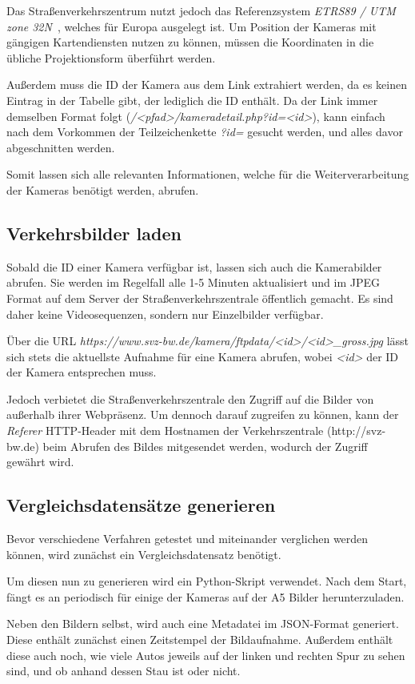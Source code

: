 Das Straßenverkehrszentrum nutzt jedoch das Referenzsystem {\em ETRS89 / UTM zone 32N}~\cite{etrs89}, welches für Europa ausgelegt ist.
Um Position der Kameras mit gängigen Kartendiensten nutzen zu können, müssen die Koordinaten in die übliche Projektionsform überführt werden.

Außerdem muss die ID der Kamera aus dem Link extrahiert werden, da es keinen Eintrag in der Tabelle gibt, der lediglich die ID enthält.
Da der Link immer demselben Format folgt ({\em /<pfad>/kameradetail.php?id=<id>}), kann einfach nach dem Vorkommen der Teilzeichenkette {\em ?id=} gesucht werden, und alles davor abgeschnitten werden.

Somit lassen sich alle relevanten Informationen, welche für die Weiterverarbeitung der Kameras benötigt werden, abrufen.

\subsection{Verkehrsbilder laden}
Sobald die ID einer Kamera verfügbar ist, lassen sich auch die Kamerabilder abrufen.
Sie werden im Regelfall alle 1-5 Minuten aktualisiert und im JPEG Format auf dem Server der Straßenverkehrszentrale öffentlich gemacht.
Es sind daher keine Videosequenzen, sondern nur Einzelbilder verfügbar.

Über die URL {\em https://www.svz-bw.de/kamera/ftpdata/<id>/<id>\_gross.jpg} lässt sich stets die aktuellste Aufnahme für eine Kamera abrufen, wobei {\em <id>} der ID der Kamera entsprechen muss.

Jedoch verbietet die Straßenverkehrszentrale den Zugriff auf die Bilder von außerhalb ihrer Webpräsenz.
Um dennoch darauf zugreifen zu können, kann der {\em Referer} HTTP-Header mit dem Hostnamen der Verkehrszentrale (http://svz-bw.de) beim Abrufen des Bildes mitgesendet werden, wodurch der Zugriff gewährt wird. 

\subsection{Vergleichsdatensätze generieren}
Bevor verschiedene Verfahren getestet und miteinander verglichen werden können, wird zunächst ein Vergleichsdatensatz benötigt.

Um diesen nun zu generieren wird ein Python-Skript verwendet.
Nach dem Start, fängt es an periodisch für einige der Kameras auf der A5 Bilder herunterzuladen.

Neben den Bildern selbst, wird auch eine Metadatei im JSON-Format generiert.
Diese enthält zunächst einen Zeitstempel der Bildaufnahme.
Außerdem enthält diese auch noch, wie viele Autos jeweils auf der linken und rechten Spur zu sehen sind, und ob anhand dessen Stau ist oder nicht.

